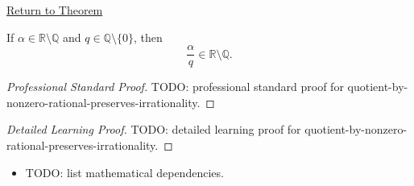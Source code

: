 \newpage
{}
\label{prf:quotient-by-nonzero-rational-preserves-irrationality}

\begin{remark*}[Return]
\hyperref[thm:quotient-by-nonzero-rational-preserves-irrationality]{Return to Theorem}
\end{remark*}

\begin{theorem*}
If $\alpha\in\mathbb{R}\setminus\mathbb{Q}$ and
$q\in\mathbb{Q}\setminus\{0\}$, then
\[
\frac{\alpha}{q}\in\mathbb{R}\setminus\mathbb{Q}.
\]
\end{theorem*}

\begin{proof}[Professional Standard Proof]
\LRAProofBodyStart
TODO: professional standard proof for quotient-by-nonzero-rational-preserves-irrationality.
\end{proof}

\begin{proof}[Detailed Learning Proof]
\LRAProofBodyStart
TODO: detailed learning proof for quotient-by-nonzero-rational-preserves-irrationality.
\end{proof}

\begin{remark*}
\end{remark*}

\begin{dependencies}
\begin{itemize}
  \item TODO: list mathematical dependencies.
\end{itemize}
\end{dependencies}

\clearpage
